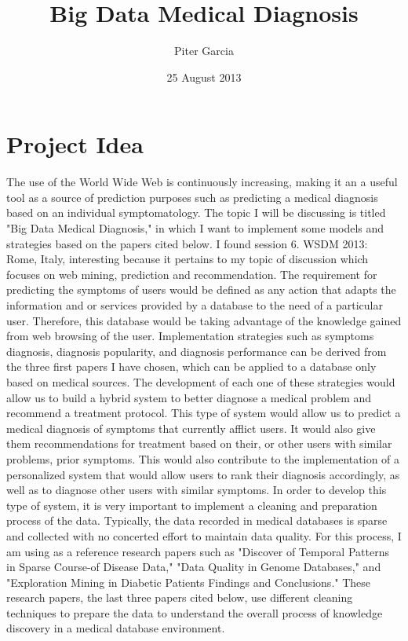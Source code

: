 \documentclass{sig-alternate}
\title{Big Data Medical Diagnosis}
\author{
\alignauthor
Piter Garcia
}
\date{25 August 2013}
\begin{document}
\maketitle


\section{Project Idea}
\label{Project Idea}

The use of the World Wide Web is continuously increasing, making it an a useful tool as a source of prediction purposes such as predicting a medical diagnosis based on an individual symptomatology. The topic I will be discussing is titled "Big Data Medical Diagnosis," in which I want to implement some models and strategies based on the papers cited below. I found session 6. WSDM 2013: Rome, Italy, interesting because it pertains to my topic of discussion which focuses on web mining, prediction and recommendation. The requirement for predicting the symptoms of users would be defined as any action that adapts the information and or services provided by a database to the need of a particular user. Therefore, this database would be taking advantage of the knowledge gained from web browsing of the user. Implementation strategies such as symptoms diagnosis, diagnosis popularity, and diagnosis performance can be derived from the three first papers I have chosen, which can be applied to a database only based on medical sources. The development of each one of these strategies would allow us to build a hybrid system to better diagnose a medical problem and recommend a treatment protocol. This type of system would allow us to predict a medical diagnosis of symptoms that currently afflict users. It would also give them recommendations for treatment based on their, or other users with similar problems, prior symptoms. This would also contribute to the implementation of a personalized system that would allow users to rank their diagnosis accordingly, as well as to diagnose other users with similar symptoms. In order to develop this type of system, it is very important to implement a cleaning and preparation process of the data. Typically, the data recorded in medical databases is sparse and collected with no concerted effort to maintain data quality. For this process, I am using as a reference research papers such as "Discover of Temporal Patterns in Sparse Course-of Disease Data," "Data Quality in Genome Databases," and "Exploration Mining in Diabetic Patients Findings and Conclusions." These research papers, the last three papers cited below, use different cleaning techniques to prepare the data to understand the overall process of knowledge discovery in a medical database environment. 
\end{document}
